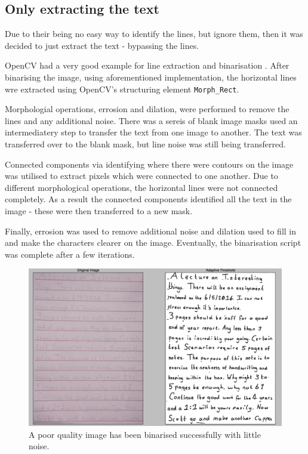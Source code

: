 \subsection{Only extracting the text}
Due to their being no easy way to identify the lines, but ignore them, then it was decided to just extract the text - bypassing the lines.

OpenCV had a very good example for line extraction and binarisation \cite{citeulike:14006256}. After binarising the image, using aforementioned implementation, the horizontal lines wre extracted using OpenCV's structuring element \texttt{Morph\_Rect}.

Morphologial operations, errosion and dilation, were performed to remove the lines and any additional noise. There was a sereis of blank image masks used an intermediatery step to transfer the text from one image to another. The text was transferred over to the blank mask, but line noise was still being transferred.

Connected components via identifying where there were contours on the image was utilised to extract pixels which were connected to one another. Due to different morphological operations, the horizontal lines were not connected completely. As a result the connected components identified all the text in the image - these were then transferred to a new mask.

Finally, errosion was used to remove additional noise and dilation used to fill in and make the characters clearer on the image. Eventually, the binarisation script was complete after a few iterations.

\begin{figure}[H]
  \centering
  \includegraphics{images/hard_image}
  \caption{A poor quality image has been binarised successfully with little noise.}
  \label{fig:poor_quality}
\end{figure}

